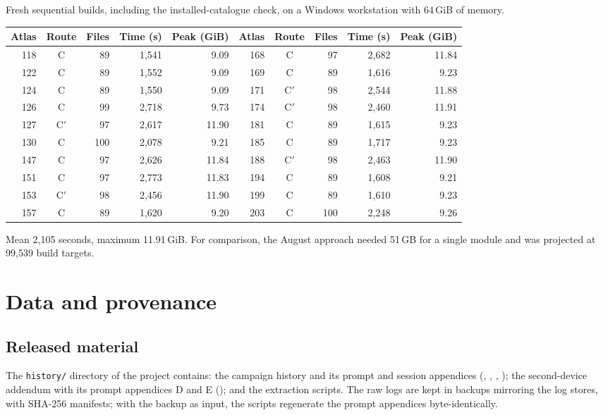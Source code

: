 \documentclass[11pt,a4paper]{article}
\newcommand{\ttt}[1]{\texttt{#1}}
\begin{document}
Fresh sequential builds, including the installed-catalogue check, on a Windows workstation with 64\,GiB of
memory.

\begin{table}[h]
\centering\small
\begin{tabular}{@{}rcrrr@{\qquad}rcrrr@{}}
\toprule
Atlas & Route & Files & Time (s) & Peak (GiB) & Atlas & Route & Files & Time (s) & Peak (GiB)\\ \midrule
118 & C & 89 & 1,541 & 9.09 & 168 & C & 97 & 2,682 & 11.84\\
122 & C & 89 & 1,552 & 9.09 & 169 & C & 89 & 1,616 & 9.23\\
124 & C & 89 & 1,550 & 9.09 & 171 & C$'$ & 98 & 2,544 & 11.88\\
126 & C & 99 & 2,718 & 9.73 & 174 & C$'$ & 98 & 2,460 & 11.91\\
127 & C$'$ & 97 & 2,617 & 11.90 & 181 & C & 89 & 1,615 & 9.23\\
130 & C & 100 & 2,078 & 9.21 & 185 & C & 89 & 1,717 & 9.23\\
147 & C & 97 & 2,626 & 11.84 & 188 & C$'$ & 98 & 2,463 & 11.90\\
151 & C & 97 & 2,773 & 11.83 & 194 & C & 89 & 1,608 & 9.21\\
153 & C$'$ & 98 & 2,456 & 11.90 & 199 & C & 89 & 1,610 & 9.23\\
157 & C & 89 & 1,620 & 9.20 & 203 & C & 100 & 2,248 & 9.26\\
\bottomrule
\end{tabular}
\end{table}

Mean 2,105 seconds, maximum 11.91\,GiB. For comparison, the August approach needed 51\,GB for a single module
and was projected at 99,539 build targets.

\section{Data and provenance}\label{app:data}

\subsection{Released material}

The \ttt{history/} directory of the project contains: the campaign history and its prompt and session
appendices (, ,
, ); the second-device addendum with its prompt
appendices D and E (); and the extraction scripts. The raw logs are kept in
backups mirroring the log stores, with SHA-256 manifests; with the backup as input, the scripts regenerate the
prompt appendices byte-identically.
\end{document}
